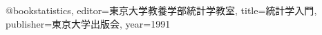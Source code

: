 @book{statistics,
    editor={東京大学教養学部統計学教室},
    title={統計学入門},
    publisher={東京大学出版会},
    year={1991}
}